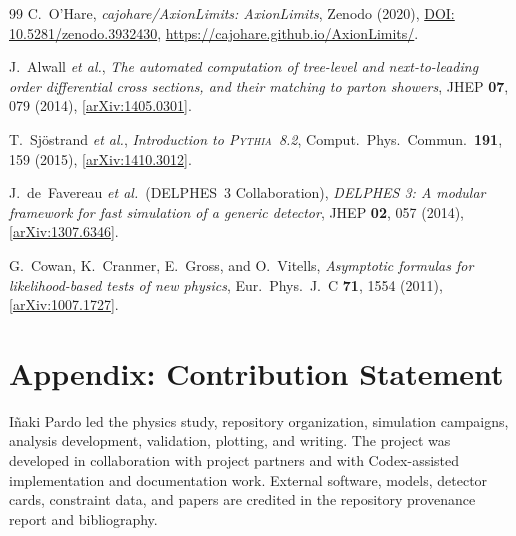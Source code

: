 \documentclass[12pt,a4paper]{article}
\begin{document}
\begin{thebibliography}{99}
C.~O'Hare,
\textit{cajohare/AxionLimits: AxionLimits},
Zenodo (2020),
\href{https://doi.org/10.5281/zenodo.3932430}{DOI: 10.5281/zenodo.3932430},
\url{https://cajohare.github.io/AxionLimits/}.

J.~Alwall \textit{et al.},
\textit{The automated computation of tree-level and next-to-leading order differential
cross sections, and their matching to parton showers},
JHEP \textbf{07}, 079 (2014),
[\href{https://arxiv.org/abs/1405.0301}{arXiv:1405.0301}].

T.~Sjöstrand \textit{et al.},
\textit{Introduction to \textsc{Pythia}~8.2},
Comput.\ Phys.\ Commun.\ \textbf{191}, 159 (2015),
[\href{https://arxiv.org/abs/1410.3012}{arXiv:1410.3012}].

J.~de~Favereau \textit{et al.}\ (DELPHES~3 Collaboration),
\textit{DELPHES 3: A modular framework for fast simulation of a generic detector},
JHEP \textbf{02}, 057 (2014),
[\href{https://arxiv.org/abs/1307.6346}{arXiv:1307.6346}].

G.~Cowan, K.~Cranmer, E.~Gross, and O.~Vitells,
\textit{Asymptotic formulas for likelihood-based tests of new physics},
Eur.\ Phys.\ J.\ C \textbf{71}, 1554 (2011),
[\href{https://arxiv.org/abs/1007.1727}{arXiv:1007.1727}].

\end{thebibliography}

\appendix
\section*{Appendix: Contribution Statement}

Iñaki Pardo led the physics study, repository organization, simulation
campaigns, analysis development, validation, plotting, and writing. The project
was developed in collaboration with project partners and with Codex-assisted
implementation and documentation work. External software, models, detector
cards, constraint data, and papers are credited in the repository provenance
report and bibliography.
\end{document}
